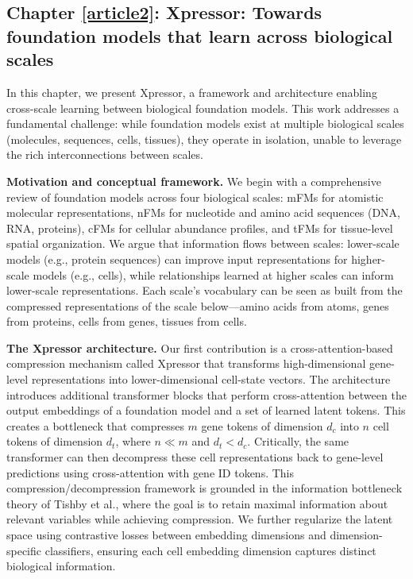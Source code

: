 \subsection{Chapter \ref{article2}: Xpressor: Towards foundation models that learn across biological scales}

In this chapter, we present Xpressor, a framework and architecture enabling cross-scale learning between biological foundation models. This work addresses a fundamental challenge: while foundation models exist at multiple biological scales (molecules, sequences, cells, tissues), they operate in isolation, unable to leverage the rich interconnections between scales.

\textbf{Motivation and conceptual framework.} We begin with a comprehensive review of foundation models across four biological scales: \glspl{mFM} for atomistic molecular representations, \glspl{nFM} for nucleotide and amino acid sequences (\gls{DNA}, \gls{RNA}, proteins), \glspl{cFM} for cellular abundance profiles, and \glspl{tFM} for tissue-level spatial organization. We argue that information flows between scales: lower-scale models (e.g., protein sequences) can improve input representations for higher-scale models (e.g., cells), while relationships learned at higher scales can inform lower-scale representations. Each scale's vocabulary can be seen as built from the compressed representations of the scale below---amino acids from atoms, genes from proteins, cells from genes, tissues from cells.

\textbf{The Xpressor architecture.} Our first contribution is a cross-attention-based compression mechanism called Xpressor that transforms high-dimensional gene-level representations into lower-dimensional cell-state vectors. The architecture introduces additional transformer blocks that perform cross-attention between the output embeddings of a foundation model and a set of learned latent tokens. This creates a bottleneck that compresses $m$ gene tokens of dimension $d_c$ into $n$ cell tokens of dimension $d_t$, where $n \ll m$ and $d_t < d_c$. Critically, the same transformer can then decompress these cell representations back to gene-level predictions using cross-attention with gene ID tokens. This compression/decompression framework is grounded in the information bottleneck theory of Tishby et al., where the goal is to retain maximal information about relevant variables while achieving compression. We further regularize the latent space using contrastive losses between embedding dimensions and dimension-specific classifiers, ensuring each cell embedding dimension captures distinct biological information.

